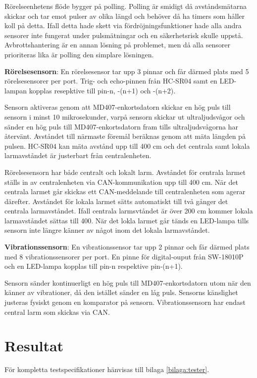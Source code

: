 \documentclass{article}
\begin{document}
Rörelseenhetens flöde bygger på polling. Polling är smidigt då avståndsmätarna skickar och tar emot pulser av olika längd 
och behöver då ha timers som håller koll på detta. Ifall detta hade skett via fördröjningsfunktioner hade alla andra sensorer 
inte fungerat under pulsmätningar och en säkerhetsrisk skulle uppstå. Avbrottshantering är en annan lösning på problemet, 
men då alla sensorer prioriteras lika är polling den simplare lösningen.


\textbf{Rörelsesensorn}:
En rörelsesensor tar upp 3 pinnar och får därmed plats med 5 rörelsesensorer per port.
Trig- och echo-pinnen från HC-SR04 samt en LED-lampan kopplas resepktive till  pin-n, -(n+1) och -(n+2).


Sensorn aktiveras genom att MD407-enkortsdatorn skickar en hög puls till sensorn i minst 10 mikrosekunder, 
varpå sensorn skickar ut ultraljudsvågor och sänder en hög puls till MD407-enkortsdatorn fram tills ultraljudsvågorna har återvänt. Avståndet till närmaste föremål beräknas genom att mäta längden på pulsen.
HC-SR04 kan mäta avstånd upp till 400 cm och det centrala samt lokala larmavståndet är justerbart från centralenheten.

Rörelsesensorn har både centralt och lokalt larm. Avståndet för centrala larmet ställs in av centralenheten via CAN-kommunikation 
upp till 400 cm. När det centrala larmet går skickas ett CAN-meddelande till centralenheten som agerar därefter. 
Avståndet för lokala larmet sätts automatiskt till två gånger det centrala larmavståndet. Ifall centrala larmsvtåndet är över 200 cm kommer 
lokala larmavståndet sättas till 400. När det lokla larmet går tänds en LED-lampa tills sensorn inte längre känner av något inom 
det lokala larmavståndet.

\textbf{Vibrationssensorn}:
En vibrationssensor tar upp 2 pinnar och får därmed plats med 8 vibrationssensorer per port. 
En pinne för digital-ouput från SW-18010P och en LED-lampa kopplas till pin-n respektive pin-(n+1).

Sensorn sänder kontinuerligt en hög puls till MD407-enkortsdatorn utom när den
känner av vibrationer, då den istället sänder en låg puls. Sensorns känslighet justeras fysiskt genom en komparator på sensorn. 
Vibrationssensorn har endast central larm som skickas via CAN.

 \section{Resultat}
 För kompletta testspecifikationer hänvisas till bilaga \ref{bilaga:tester}.
\end{document}
